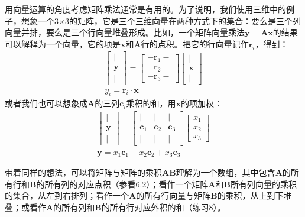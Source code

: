 \documentclass[lang=cn,12pt]{elegantbook}
\begin{document}
用向量运算的角度考虑矩阵乘法通常是有用的。为了说明，我们使用三维中的例子，想象一个3×3的矩阵，它是三个三维向量在两种方式下的集合：要么是三个列向量并排，要么是三个行向量堆叠形成。比如，一个矩阵向量乘法$\mathbf{y} = \mathbf{Ax}$的结果可以解释为一个向量，它的项是$\mathbf{x}$和$\mathbf{A}$行的点积。把它的行向量记作$\mathbf{r}_i$，得到：
$$
\begin{array}{c}
{\left[\begin{array}{c}
\mid \\
\mathbf{y} \\
\mid
\end{array}\right]=\left[\begin{array}{l}
-\mathbf{r}_{1}- \\
-\mathbf{r}_{2}- \\
-\mathbf{r}_{3}-
\end{array}\right]\left[\begin{array}{c}
\mid \\
\mathbf{x} \\
\mid
\end{array}\right]} \\
y_{i}=\mathbf{r}_{i} \cdot \mathbf{x}
\end{array}
$$
或者我们也可以想象成$\mathbf{A}$的三列$\mathbf{c}_i$乘积的和，用$\mathbf{x}$的项加权：
$$
\begin{array}{c}
{\left[\begin{array}{c}
\mid \\
\mathbf{y} \\
\mid
\end{array}\right]=\left[\begin{array}{ccc}
\mid & \mid & \mid \\
\mathbf{c}_{1} & \mathbf{c}_{2} & \mathbf{c}_{3} \\
\mid & \mid & \mid
\end{array}\right]\left[\begin{array}{l}
x_{1} \\
x_{2} \\
x_{3}
\end{array}\right]} \\
\mathbf{y}=x_{1} \mathbf{c}_{1}+x_{2} \mathbf{c}_{2}+x_{3} \mathbf{c}_{3}
\end{array}
$$

带着同样的想法，可以将矩阵与矩阵的乘积$\mathbf{AB}$理解为一个数组，其中包含$\mathbf{A}$的所有行和$\mathbf{B}$的所有列的对应点积（参看6.2）；看作一个矩阵$\mathbf{A}$和$\mathbf{B}$所有列向量的乘积的集合，从左到右排列；看作一个$\mathbf{A}$的所有行向量与矩阵$\mathbf{B}$的乘积，从上到下堆叠；或看作$\mathbf{A}$的所有列和$\mathbf{B}$的所有行对应外积的和（练习8）。
\end{document}
